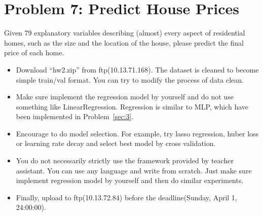 \documentclass[12pt]{article}
\begin{document}
\section{Problem 7: Predict House Prices} \label{sec:4}
Given 79 explanatory variables describing (almost) every aspect of residential homes, such as the size  and the location of the house, please predict the final price of each home.

\begin{itemize}	
	\item  Download ``hw2.zip'' from ftp(10.13.71.168). The dataset is cleaned to become simple train/val format. You can try to modify the process of data clean.
	\item Make sure implement the regression model by yourself and do not use something like LinearRegression.  Regression is similar to MLP, which have been implemented in  Problem~\ref{sec:3}.

	\item Encourage to do model selection. For example, try lasso regression, huber loss or learning rate decay and select best model by cross validation.

	\item You do not necessarily strictly use the framework provided by teacher assistant. You can use any language and write from scratch. Just make sure implement regression model by yourself and then do similar experiments.
	\item Finally, upload to ftp(10.13.72.84) before the deadline(Sunday, April 1, 24:00:00).
\end{itemize}
\end{document}
